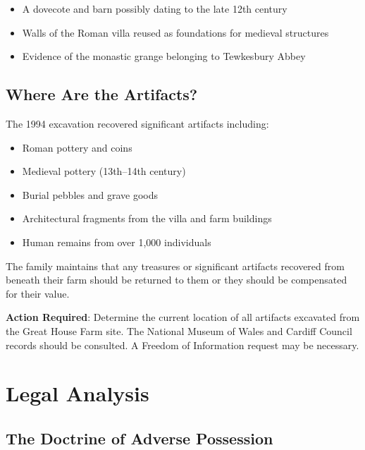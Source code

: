\documentclass[11pt,a4paper]{article}
\begin{document}
\begin{itemize}
    \item A dovecote and barn possibly dating to the late 12th century
    \item Walls of the Roman villa reused as foundations for medieval structures
    \item Evidence of the monastic grange belonging to Tewkesbury Abbey
\end{itemize}

\subsection{Where Are the Artifacts?}

\begin{grievance}
The 1994 excavation recovered significant artifacts including:
\begin{itemize}
    \item Roman pottery and coins
    \item Medieval pottery (13th--14th century)
    \item Burial pebbles and grave goods
    \item Architectural fragments from the villa and farm buildings
    \item Human remains from over 1,000 individuals
\end{itemize}

The family maintains that any treasures or significant artifacts recovered from beneath their farm should be returned to them or they should be compensated for their value.
\end{grievance}

\begin{action}
\textbf{Action Required}: Determine the current location of all artifacts excavated from the Great House Farm site. The National Museum of Wales and Cardiff Council records should be consulted. A Freedom of Information request may be necessary.
\end{action}

\newpage

\section{Legal Analysis}

\subsection{The Doctrine of Adverse Possession}
\end{document}
